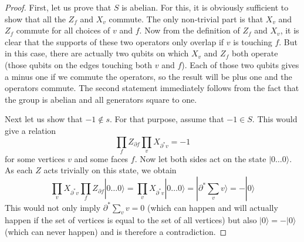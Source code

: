 \documentclass[a4paper, draft]{article}
\theoremstyle{own}
\theoremstyle{remark}
\begin{document}
\begin{proof}
First, let us prove that $S$ is abelian. For this, it is obviously sufficient to show that all the $Z_f$ and $X_v$ commute. The only non-trivial part is that $X_v$ and $Z_f$ commute for all choices of $v$ and $f$. Now from the definition of $Z_f$ and $X_v$, it is clear that the supports of these two operators only overlap if $v$ is touching $f$. But in this case, there are actually two qubits on which $X_v$ and $Z_f$ both operate (those qubits on the edges touching both $v$ and $f$). Each of those two qubits gives a minus one if we commute the operators, so the result will be plus one and the operators commute. The second statement immediately follows from the fact that the group is abelian and all generators square to one.

Next let us show that $-1 \notin s$. For that purpose, assume that $-1 \in S$. This would give a relation
$$
\prod_f Z_{\partial f} \prod_v X_{\partial^* v} = - 1
$$
for some vertices $v$ and some faces $f$. Now let both sides act on the state $| 0 \dots 0 \rangle$. As each $Z$ acts trivially on this state, we obtain
$$
\prod_v X_{\partial^* v} \prod_f Z_{\partial f} |0 \dots 0 \rangle 
= \prod_v X_{\partial^* v}  |0 \dots 0 \rangle = |\partial^* \sum_v v \rangle = - |0 \rangle
$$
This would not only imply $\partial^* \sum_v v = 0$ (which can happen and will actually happen if the set of vertices is equal to the set of all vertices) but also $| 0 \rangle = - |0 \rangle$ (which can never happen) and is therefore a contradiction. 


\end{proof}
\end{document}
